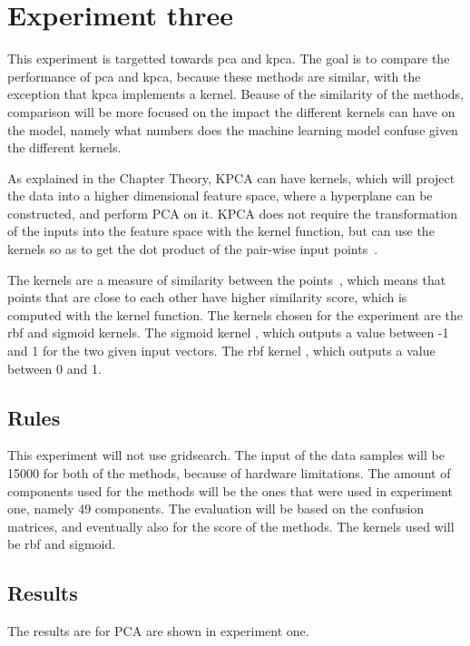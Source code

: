 
\section{Experiment three}
This experiment is targetted towards \gls{pca} and \gls{kpca}. The goal is to compare the performance of \gls{pca} and \gls{kpca}, because these methods are similar, with the exception that \gls{kpca} implements a kernel. Beause of the similarity of the methods, comparison will be more focused on the impact the different kernels can have on the model, namely what numbers does the machine learning model confuse given the different kernels.


As explained in the Chapter Theory, KPCA can have kernels, which will project the data into a higher dimensional feature space, where a hyperplane can be constructed, and perform PCA on it. KPCA does not require the transformation of the inputs into the feature space with the kernel function, but can use the kernels so as to get the dot product of the pair-wise input points~\cite{kpca-book}.


The kernels are a measure of similarity between the points~\cite{scikit-learn}, which means that points that are close to each other have higher similarity score, which is computed with the kernel function. The kernels chosen for the experiment are the \gls{rbf} and sigmoid kernels. The sigmoid kernel , which outputs a value between -1 and 1 for the two given input vectors. The \gls{rbf} kernel , which outputs a value between 0 and 1.


\subsection{Rules}
This experiment will not use gridsearch. The input of the data samples will be 15000 for both of the methods, because of hardware limitations. The amount of components used for the methods will be the ones that were used in experiment one, namely 49 components. The evaluation will be based on the confusion matrices, and eventually also for the score of the methods. The kernels used will be \gls{rbf} and sigmoid.


\subsection{Results}
The results are for PCA are shown in experiment one.


